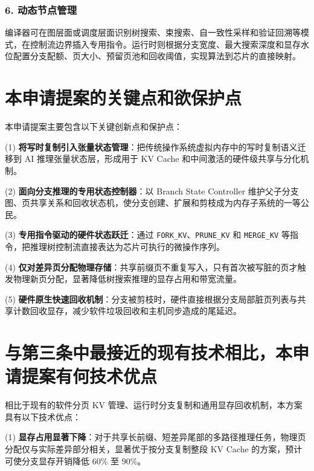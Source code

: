 \documentclass[12pt,a4paper]{article}
\begin{document}
\subsubsection{6. 动态节点管理}
编译器可在图层面或调度层面识别树搜索、束搜索、自一致性采样和验证回溯等模式，在控制流边界插入专用指令。运行时则根据分支宽度、最大搜索深度和显存水位配置分支配额、页大小、预留页池和回收阈值，实现算法到芯片的直接映射。

\section{本申请提案的关键点和欲保护点}

本申请提案主要包含以下关键创新点和保护点：

(1) \textbf{将写时复制引入张量状态管理}：把传统操作系统虚拟内存中的写时复制语义迁移到 AI 推理张量状态层，形成用于 KV Cache 和中间激活的硬件级共享与分化机制。

(2) \textbf{面向分支推理的专用状态控制器}：以 Branch State Controller 维护父子分支图、页共享关系和回收状态机，使分支创建、扩展和剪枝成为内存子系统的一等公民。

(3) \textbf{专用指令驱动的硬件状态跃迁}：通过 \texttt{FORK\_KV}、\texttt{PRUNE\_KV} 和 \texttt{MERGE\_KV} 等指令，把推理树控制流直接表达为芯片可执行的微操作序列。

(4) \textbf{仅对差异页分配物理存储}：共享前缀页不重复写入，只有首次被写脏的页才触发物理新页分配，显著降低树搜索推理的显存占用和带宽流量。

(5) \textbf{硬件原生快速回收机制}：分支被剪枝时，硬件直接根据分支局部脏页列表与共享计数回收显存，减少软件垃圾回收和主机同步造成的尾延迟。

\section{与第三条中最接近的现有技术相比，本申请提案有何技术优点}

相比于现有的软件分页 KV 管理、运行时分支复制和通用显存回收机制，本方案具有以下技术优点：

(1) \textbf{显存占用显著下降}：对于共享长前缀、短差异尾部的多路径推理任务，物理页分配仅与实际差异部分相关，显著优于按分支复制整段 KV Cache 的方案，预计可使分支显存开销降低 60\% 至 90\%。
\end{document}
